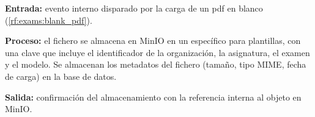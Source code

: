 \begin{functional}
    \textbf{Entrada:} evento interno disparado por la carga de un \acs{pdf} en blanco
    (\cref{rf:exams:blank_pdf}).

    \textbf{Proceso:} el fichero se almacena en MinIO en un  específico para
    plantillas, con una clave que incluye el identificador de la organización, la
    asignatura, el examen y el modelo. Se almacenan los metadatos del fichero (tamaño, tipo
    MIME, fecha de carga) en la base de datos.

    \textbf{Salida:} confirmación del almacenamiento con la referencia interna al objeto en
    MinIO.

\end{functional}
